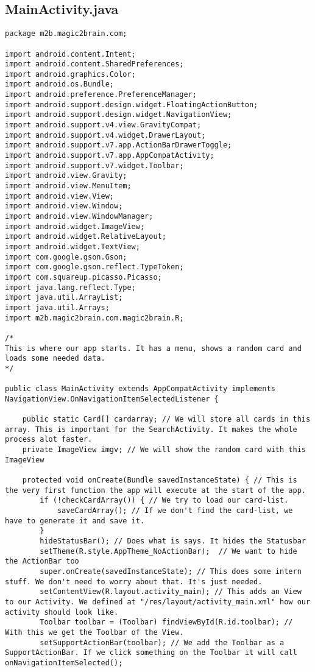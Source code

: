 \subsection*{MainActivity.java}
\begin{lstlisting}
package m2b.magic2brain.com;

import android.content.Intent;
import android.content.SharedPreferences;
import android.graphics.Color;
import android.os.Bundle;
import android.preference.PreferenceManager;
import android.support.design.widget.FloatingActionButton;
import android.support.design.widget.NavigationView;
import android.support.v4.view.GravityCompat;
import android.support.v4.widget.DrawerLayout;
import android.support.v7.app.ActionBarDrawerToggle;
import android.support.v7.app.AppCompatActivity;
import android.support.v7.widget.Toolbar;
import android.view.Gravity;
import android.view.MenuItem;
import android.view.View;
import android.view.Window;
import android.view.WindowManager;
import android.widget.ImageView;
import android.widget.RelativeLayout;
import android.widget.TextView;
import com.google.gson.Gson;
import com.google.gson.reflect.TypeToken;
import com.squareup.picasso.Picasso;
import java.lang.reflect.Type;
import java.util.ArrayList;
import java.util.Arrays;
import m2b.magic2brain.com.magic2brain.R;

/*
This is where our app starts. It has a menu, shows a random card and loads some needed data.
*/

public class MainActivity extends AppCompatActivity implements NavigationView.OnNavigationItemSelectedListener {

    public static Card[] cardarray; // We will store all cards in this array. This is important for the SearchActivity. It makes the whole process alot faster.
    private ImageView imgv; // We will show the random card with this ImageView

    protected void onCreate(Bundle savedInstanceState) { // This is the very first function the app will execute at the start of the app.
        if (!checkCardArray()) { // We try to load our card-list.
            saveCardArray(); // If we don't find the card-list, we have to generate it and save it.
        }
        hideStatusBar(); // Does what is says. It hides the Statusbar
        setTheme(R.style.AppTheme_NoActionBar);  // We want to hide the ActionBar too
        super.onCreate(savedInstanceState); // This does some intern stuff. We don't need to worry about that. It's just needed.
        setContentView(R.layout.activity_main); // This adds an View to our Activity. We defined at "/res/layout/activity_main.xml" how our activity should look like.
        Toolbar toolbar = (Toolbar) findViewById(R.id.toolbar); // With this we get the Toolbar of the View.
        setSupportActionBar(toolbar); // We add the Toolbar as a SupportActionBar. If we click something on the Toolbar it will call onNavigationItemSelected();


\end{lstlisting}
